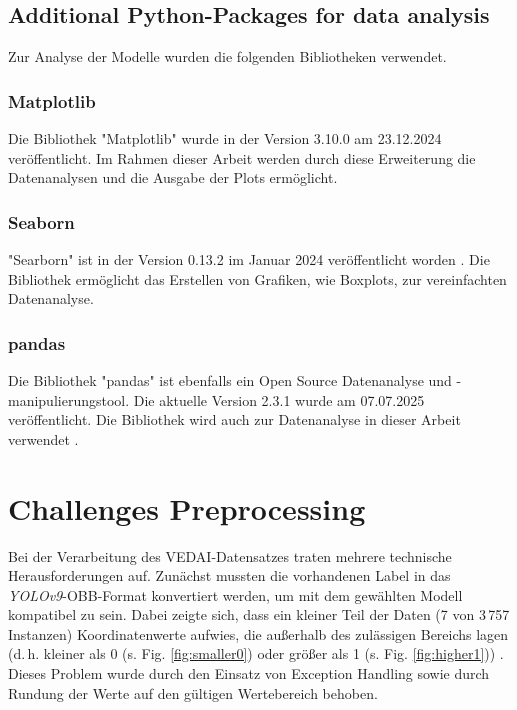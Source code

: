 \subsection{Additional Python-Packages for data analysis}
Zur Analyse der Modelle wurden die folgenden Bibliotheken verwendet.
\subsubsection*{Matplotlib}
Die Bibliothek "Matplotlib" wurde in der Version 3.10.0 am 23.12.2024 veröffentlicht\cite{matplotlib}. Im Rahmen dieser Arbeit werden durch diese Erweiterung die Datenanalysen und die Ausgabe der Plots ermöglicht.
\subsubsection*{Seaborn}
"Searborn" ist in der Version 0.13.2 im Januar 2024 veröffentlicht worden \cite{seaborn}. Die Bibliothek ermöglicht das Erstellen von Grafiken, wie Boxplots, zur vereinfachten Datenanalyse.
\subsubsection*{pandas}
Die Bibliothek "pandas" ist ebenfalls ein Open Source Datenanalyse und -manipulierungstool. Die aktuelle Version 2.3.1 wurde am 07.07.2025 veröffentlicht. Die Bibliothek wird auch zur Datenanalyse in dieser Arbeit verwendet \cite{pandas}.




\section{Challenges Preprocessing}
Bei der Verarbeitung des VEDAI-Datensatzes traten mehrere technische Herausforderungen auf. 
Zunächst mussten die vorhandenen Label in das \textit{YOLOv9}-OBB-Format konvertiert werden, um mit dem gewählten Modell kompatibel zu sein. 
Dabei zeigte sich, dass ein kleiner Teil der Daten (7 von 3\,757 Instanzen) Koordinatenwerte aufwies, die außerhalb des zulässigen Bereichs lagen (d.\,h. kleiner als 0 (s. Fig. \ref{fig:smaller0}) oder größer als 1 (s. Fig. \ref{fig:higher1})) . 
Dieses Problem wurde durch den Einsatz von Exception Handling sowie durch Rundung der Werte auf den gültigen Wertebereich behoben. 

